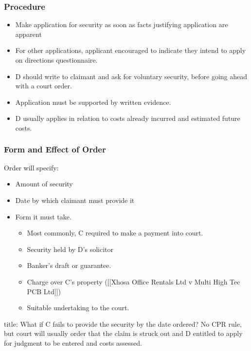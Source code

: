 \documentclass[
]{article}
\newenvironment{Shaded}{}{}
\newcommand{\NormalTok}[1]{#1}
\providecommand{\tightlist}{%
  \setlength{\itemsep}{0pt}\setlength{\parskip}{0pt}}
\begin{document}
\hypertarget{procedure-2}{%
\subsubsection{Procedure}\label{procedure-2}}

\begin{itemize}
\tightlist
\item
  Make application for security as soon as facts justifying application
  are apparent
\item
  For other applications, applicant encouraged to indicate they intend
  to apply on directions questionnaire.
\item
  D should write to claimant and ask for voluntary security, before
  going ahead with a court order.
\item
  Application must be supported by written evidence.
\item
  D usually applies in relation to costs already incurred and estimated
  future costs.
\end{itemize}

\hypertarget{form-and-effect-of-order}{%
\subsubsection{Form and Effect of
Order}\label{form-and-effect-of-order}}

Order will specify:

\begin{itemize}
\tightlist
\item
  Amount of security
\item
  Date by which claimant must provide it
\item
  Form it must take.

  \begin{itemize}
  \tightlist
  \item
    Most commonly, C required to make a payment into court.
  \item
    Security held by D's solicitor
  \item
    Banker's draft or guarantee.
  \item
    Charge over C's property ({[}{[}Xhosa Office Rentals Ltd v Multi
    High Tec PCB Ltd{]}{]})
  \item
    Suitable undertaking to the court.
  \end{itemize}
\end{itemize}

\begin{Shaded}
\begin{Highlighting}[]
\NormalTok{title: What if C fails to provide the security by the date ordered?}
\NormalTok{No CPR rule, but court will usually order that the claim is struck out and D entitled to apply for judgment to be entered and costs assessed. }
\end{Highlighting}
\end{Shaded}
\end{document}
